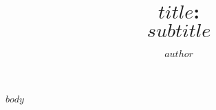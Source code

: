 \documentclass[12pt, letterpaper]{article}
\title{ $title$:\\\textit{$subtitle$} }
\author{ $author$ }
\begin{document}
\maketitle

$body$
\end{document}
